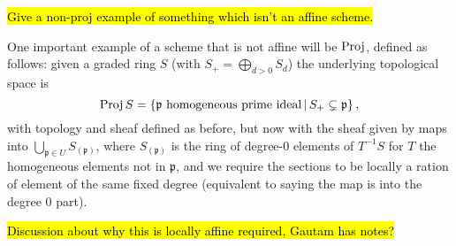 \documentclass[000-main.tex]{subfiles}
\begin{document}
\begin{example}
	\hl{Give a non-proj example of something which isn't an affine scheme.} 
\end{example}

One important example of a scheme that is not affine will be $\operatorname{Proj}$, defined as follows: given a graded ring $S$ (with $S_+ = \bigoplus_{d > 0 } S_d$) the underlying topological space is 
\[
\operatorname{Proj} S = \left \lbrace \mathfrak{p} \text{ homogeneous prime ideal} \, | \, S_+ \subsetneq \mathfrak{p} \right \rbrace ,  
\] 
with topology and sheaf defined as before, but now with the sheaf given by maps into $\bigcup_{\mathfrak{p} \in U} S_{(\mathfrak{p})}$, where $S_{(\mathfrak{p})}$ is the ring of degree-0 elements of $T^{-1}S$ for $T$ the homogeneous elements not in $\mathfrak{p}$, and we require the sections to be locally a ration of element of the same fixed degree (equivalent to saying the map is into the degree 0 part). 

\hl{Discussion about why this is locally affine required, Gautam has notes?} 
\end{document}
